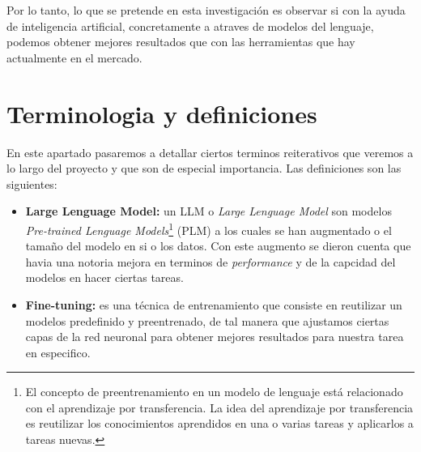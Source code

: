 Por lo tanto, lo que se pretende en esta investigación es observar si con la ayuda de inteligencia artificial, concretamente a atraves de modelos del lenguaje, podemos obtener mejores 
resultados que con las herramientas que hay actualmente en el mercado.

\section{Terminologia y definiciones}
\label{sec:terminalogia}

En este apartado pasaremos a detallar ciertos terminos reiterativos que veremos a lo largo del proyecto y que son de especial importancia. Las definiciones son las siguientes:

\begin{itemize}
    \item \textbf{Large Lenguage Model:} un LLM o \textit{Large Lenguage Model} son modelos \textit{Pre-trained Lenguage Models}\footnote{El concepto de preentrenamiento en un modelo 
                                         de lenguaje está relacionado con el aprendizaje por transferencia. La idea del aprendizaje por transferencia es reutilizar los conocimientos 
                                         aprendidos en una o varias tareas y aplicarlos a tareas nuevas.} (PLM) a los cuales se han augmentado o el tamaño del modelo en si o los datos.
                                         Con este augmento se dieron cuenta que havia una notoria mejora en terminos de \textit{performance} y de la capcidad del modelos en hacer 
                                         ciertas tareas. \cite{ZhaoWayneXin2023ASoL}
    \item \textbf{Fine-tuning:} es una técnica de entrenamiento que consiste en reutilizar un modelos predefinido y preentrenado, de tal manera que ajustamos ciertas capas de la 
                                red neuronal para obtener mejores resultados para nuestra tarea en especifico.
\end{itemize}

